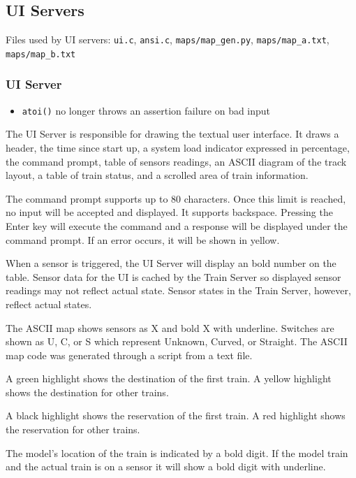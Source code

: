 \documentclass[letterpaper]{article}
\begin{document}
\subsection{UI Servers%
  \label{ui-servers}%
}

Files used by UI servers: \texttt{ui.c}, \texttt{ansi.c}, \texttt{maps/map\_gen.py}, \texttt{maps/map\_a.txt}, \texttt{maps/map\_b.txt}


\subsubsection{UI Server%
  \label{ui-server}%
}
%
\begin{itemize}

\item \texttt{atoi()} no longer throws an assertion failure on bad  input

\end{itemize}

The UI Server is responsible for drawing the textual user interface. It draws a header, the time since start up, a system load indicator expressed in percentage, the command prompt, table of sensors readings, an ASCII diagram of the track layout, a table of train status, and a scrolled area of train information.

The command prompt supports up to 80 characters. Once this limit is reached, no input will be accepted and displayed. It supports backspace. Pressing the Enter key will execute the command and a response will be displayed under the command prompt. If an error occurs, it will be shown in yellow.

When a sensor is triggered, the UI Server will display an bold number on the table. Sensor data for the UI is cached by the Train Server so displayed sensor readings may not reflect actual state. Sensor states in the Train Server, however, reflect actual states.

The ASCII map shows sensors as X and bold X with underline. Switches are shown as U, C, or S which represent Unknown, Curved, or Straight. The ASCII map code was generated through a script from a text file.

A green highlight shows the destination of the first train. A yellow highlight shows the destination for other trains.

A black highlight shows the reservation of the first train. A red highlight shows the reservation for other trains.

The model's location of the train is indicated by a bold digit. If the model train and the actual train is on a sensor it will show a bold digit with underline.
\end{document}
